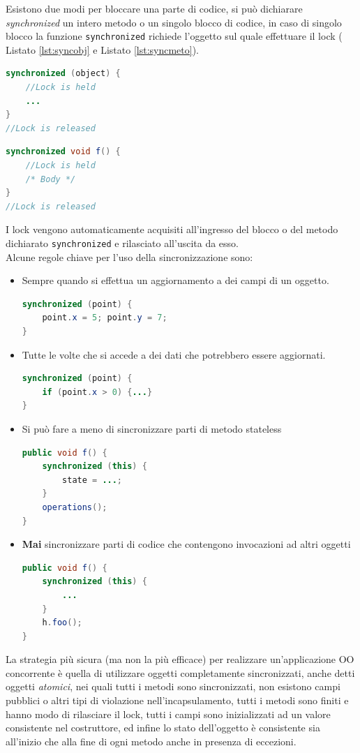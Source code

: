 Esistono due modi per bloccare una parte di codice, si può dichiarare \emph{synchronized} un intero metodo o un singolo blocco di codice, in caso di singolo blocco la funzione \texttt{synchronized} richiede l'oggetto sul quale effettuare il lock ( Listato \ref{lst:syncobj} e  Listato \ref{lst:syncmeto}).\\
\pagebreak
\begin{lstlisting}[language=Java,caption={Sincronizzazione di una parte di codice},label=lst:syncobj]
synchronized (object) {
	//Lock is held
	...
}
//Lock is released
\end{lstlisting}
\begin{lstlisting}[language=Java,caption={Sincronizzazione di un metodo},label=lst:syncmeto]
synchronized void f() {
	//Lock is held
	/* Body */
}
//Lock is released
\end{lstlisting}
I lock vengono automaticamente acquisiti all'ingresso del blocco o del metodo dichiarato \texttt{synchronized} e rilasciato all'uscita da esso.\\
Alcune regole chiave per l'uso della sincronizzazione sono:
\begin{itemize}
\item Sempre quando si effettua un aggiornamento a dei campi di un oggetto.
\begin{lstlisting}[language=Java]
synchronized (point) {
	point.x = 5; point.y = 7;
}
\end{lstlisting}
\item Tutte le volte che si accede a dei dati che potrebbero essere aggiornati.
\begin{lstlisting}[language=Java]
synchronized (point) {
	if (point.x > 0) {...}
}
\end{lstlisting}
\item Si può fare a meno di sincronizzare parti di metodo stateless
\begin{lstlisting}[language=Java]
public void f() {
	synchronized (this) {
		state = ...;
	}
	operations();
}
\end{lstlisting}
\item \textbf{Mai} sincronizzare parti di codice che contengono invocazioni ad altri oggetti
\begin{lstlisting}[language=Java]
public void f() {
	synchronized (this) {
		...
	}
	h.foo();
}
\end{lstlisting}
\end{itemize}
La strategia più sicura (ma non la più efficace) per realizzare un'applicazione OO concorrente è quella di utilizzare oggetti completamente sincronizzati, anche detti oggetti \emph{atomici}, nei quali tutti i metodi sono sincronizzati, non esistono campi pubblici o altri tipi di violazione nell'incapsulamento, tutti i metodi sono finiti e hanno modo di rilasciare il lock, tutti i campi sono inizializzati ad un valore consistente nel costruttore, ed infine lo stato dell'oggetto è consistente sia all'inizio che alla fine di ogni metodo anche in presenza di eccezioni.\\
